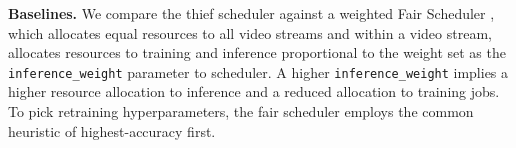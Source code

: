 
\textbf{Baselines.}
We compare the thief scheduler against a weighted {Fair Scheduler} \cite{fair-1, fair-2, videostorm}, which allocates equal resources to all video streams and within a video stream, allocates resources to training and inference proportional to the weight set as the \lstinline{inference_weight} parameter to scheduler. A higher \lstinline{inference_weight} implies a higher resource allocation to inference and a reduced allocation to training jobs. To pick retraining hyperparameters, the fair scheduler employs the common heuristic of highest-accuracy first. 






















